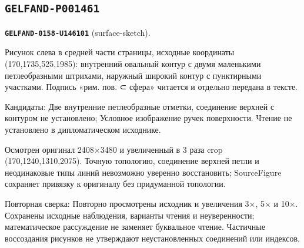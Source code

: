 \subsection*{\texttt{GELFAND-P001461}}
\par\noindent\leavevmode{}\label{GELFAND-0158-U146101}\label{GELFAND-P001461:surface-sketch}\textbf{\texttt{GELFAND-0158-U146101}} (surface-sketch).\nopagebreak[4]\par
Рисунок слева в средней части страницы, исходные координаты (170,1735,525,1985): внутренний овальный контур с двумя маленькими петлеобразными штрихами, наружный широкий контур с пунктирными участками. Подпись «рим. пов. ⊂ сфера» читается и отдельно передана в тексте.\par
Кандидаты: Две внутренние петлеобразные отметки, соединение верхней с контуром не установлено; Условное изображение ручек поверхности. Чтение не установлено в дипломатическом исходнике.\par
Осмотрен оригинал 2408×3480 и увеличенный в 3 раза crop (170,1240,1310,2075). Точную топологию, соединение верхней петли и неодинаковые типы линий невозможно уверенно восстановить; SourceFigure сохраняет привязку к оригиналу без придуманной топологии.\par
Повторная сверка: Повторно просмотрены исходник и увеличения 3×, 5× и 10×. Сохранены исходные наблюдения, варианты чтения и неуверенности; математическое рассуждение не заменяет буквальное чтение. Частичные воссоздания рисунков не утверждают неустановленных соединений или индексов.\par\medskip
